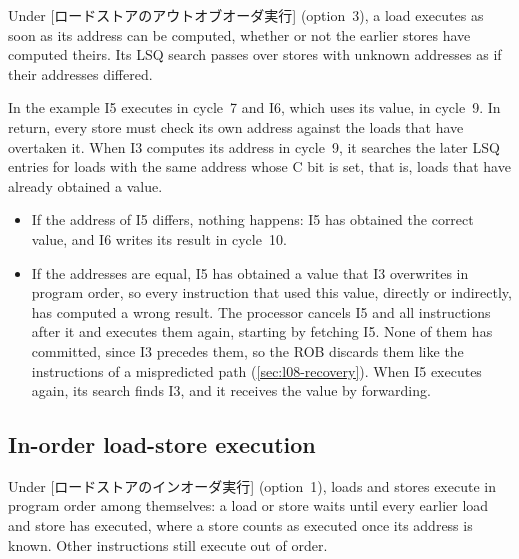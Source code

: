 \documentclass[../main.tex]{subfiles}
\begin{document}
\begin{definition}
  \label{def:l09-ooo}
  Under [ロードストアのアウトオブオーダ実行]
  (option~3), a load executes as soon as its address can be computed, whether
  or not the earlier stores have computed theirs.  Its LSQ search passes over
  stores with unknown addresses as if their addresses differed.
\end{definition}

In the example I5 executes in cycle~7 and I6, which uses its value, in
cycle~9.  In return, every store must check its own address against the loads
that have overtaken it.  When I3 computes its
address in cycle~9, it searches the later LSQ entries for loads with the same
address whose C bit is set, that is, loads that have already obtained a
value.
\begin{itemize}
  \item If the address of I5 differs, nothing happens: I5 has obtained the
    correct value, and I6 writes its result in cycle~10.
  \item If the addresses are equal, I5 has obtained a value that I3
    overwrites in program order, so every instruction that used this value,
    directly or indirectly, has computed a wrong result.  The processor cancels
    I5 and all instructions after it and executes them again, starting by
    fetching I5.  None of them has committed, since I3 precedes them, so the
    ROB discards them like the instructions of a mispredicted path
    (\cref{sec:l08-recovery}).  When I5 executes again, its
    search finds I3, and it receives the value by forwarding.
\end{itemize}

\subsection{In-order load-store execution}

\begin{definition}
  \label{def:l09-in-order}
  Under [ロードストアのインオーダ実行]
  (option~1), loads and stores execute in program order among themselves: a
  load or store waits until every earlier load and store has executed, where a
  store counts as executed once its address is known.  Other instructions
  still execute out of order.
\end{definition}
\end{document}
